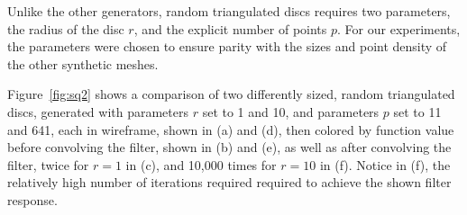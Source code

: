 Unlike the other generators, random triangulated discs requires two parameters, the radius of the disc $r$, and the explicit number of points $p$. For our experiments, the parameters were chosen to ensure parity with the sizes and point density of the other synthetic meshes.



Figure~\ref{fig:sq2} shows a comparison of two differently sized, random triangulated discs, generated with parameters $r$ set to 1 and 10, and parameters $p$ set to 11 and 641, each in wireframe, shown in (a) and (d), then colored by function value before convolving the filter, shown in (b) and (e), as well as after convolving the filter, twice for $r=1$ in (c), and 10,000 times for $r=10$ in (f). Notice in (f), the relatively high number of iterations required required to achieve the shown filter response.

